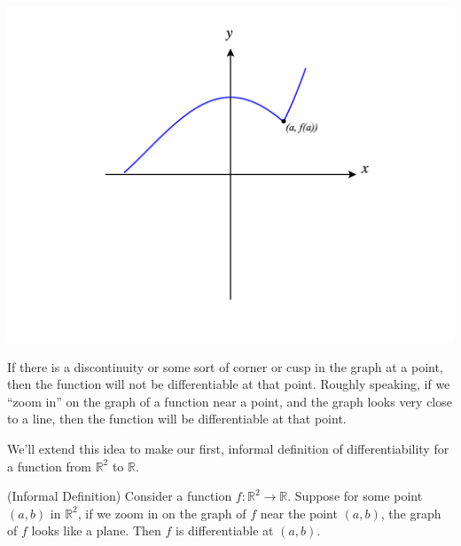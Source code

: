 \documentclass{ximera}
\begin{document}
\begin{problem}
\begin{multipleChoice}
\end{multipleChoice}

\begin{image}
\includegraphics[width = \textwidth]{CalcPlot3D-sv_cusp}
\end{image}

\begin{multipleChoice}
\end{multipleChoice}

\end{problem}

If there is a discontinuity or some sort of corner or cusp in the graph at a point, then the function will not be differentiable at that point. Roughly speaking, if we ``zoom in'' on the graph of a function near a point, and the graph looks very close to a line, then the function will be differentiable at that point.


We'll extend this idea to make our first, informal definition of differentiability for a function from $\mathbb{R}^2$ to $\mathbb{R}$.

\begin{definition}
(Informal Definition) Consider a function $f:\mathbb{R}^2\rightarrow \mathbb{R}$. Suppose for some point $(a,b)$ in $\mathbb{R}^2$, if we zoom in on the graph of $f$ near the point $(a,b)$, the graph of $f$ looks like a plane. Then $f$ is differentiable at $(a,b)$.
\end{definition}
\end{document}
